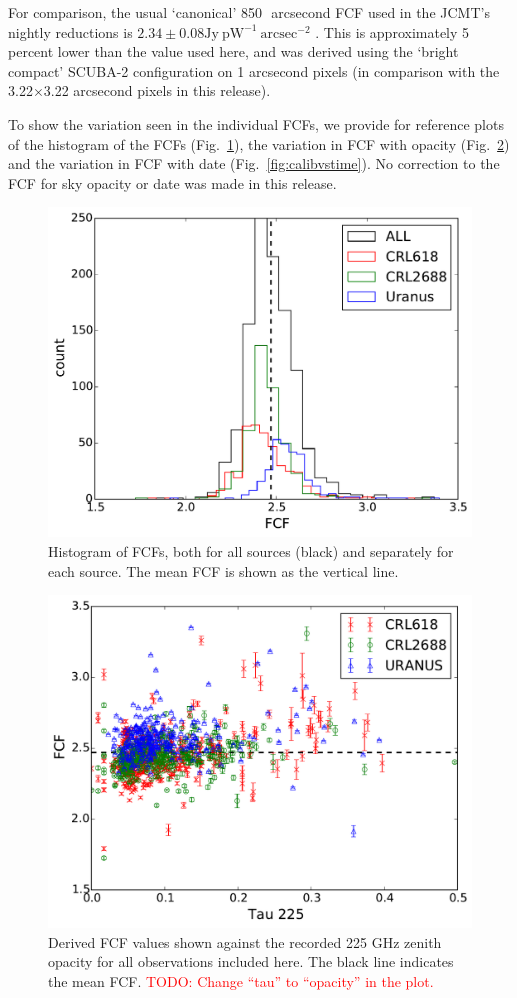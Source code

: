 \documentclass[twocolumn]{aastex6}
\newcommand{\todo}[1]{\textcolor{red}{TODO: #1}}
\begin{document}
For comparison, the usual `canonical' 850\,\micron\ arcsecond FCF used
in the JCMT's nightly reductions is
$2.34 \pm 0.08 \mathrm{Jy}\ \mathrm{pW}^{-1}\ \mathrm{arcsec}^{-2}$
\citep{Dempsey2013}. This is approximately 5 percent lower than the
value used here, and was derived using the `bright compact' SCUBA-2
configuration on 1 arcsecond pixels (in comparison with the
3.22$\times$3.22 arcsecond pixels in this release).

To show the variation seen in the individual FCFs, we provide for
reference plots of the histogram of the FCFs
(Fig.~\ref{fig:calibhist}), the variation in FCF with opacity
(Fig.~\ref{fig:calibvstau}) and the variation in FCF with date
(Fig.~\ref{fig:calibvstime}). No correction to the FCF for sky opacity or date
was made in this release.

\begin{figure}
  \centering
  \includegraphics[width=0.7\linewidth]{Legacy_calibration_histogram}
  \caption{Histogram of FCFs, both for all sources (black) and
    separately for each source. The mean FCF is shown as the vertical line. }
  \label{fig:calibhist}
\end{figure}

 \begin{figure}
   \centering
   \includegraphics[width=0.7\linewidth]{Legacy_calibration_vstau}
   \caption{Derived FCF values shown against the recorded 225 GHz zenith opacity
     for all observations included here. The black line indicates the
     mean FCF.
     \todo{Change ``tau'' to ``opacity'' in the plot.}}
   \label{fig:calibvstau}
 \end{figure}
\end{document}
